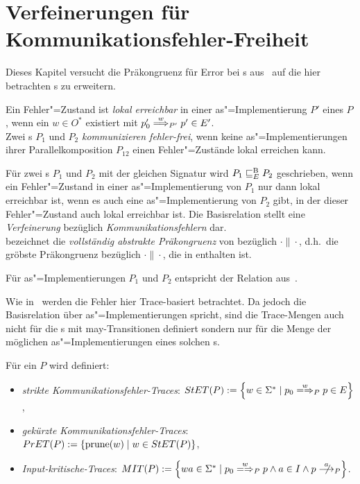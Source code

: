 \chapter{Verfeinerungen für Kommunikationsfehler-Freiheit}

Dieses Kapitel versucht die Präkongruenz für Error bei \EIO{}s
aus~\cite{Schinko2016BA} auf die hier betrachten \MEIO{}s zu erweitern.

\begin{Def}
  Ein Fehler"=Zustand ist \emph{lokal erreichbar} in einer
  as"=Implementierung $P'$ eines \MEIO{} $P$, wenn ein $w\in O^*$ existiert mit
  $p'_0 \weakmust[w]_{P'} p'\in E'$.\\
  Zwei \MEIO{}s $P_1$ und $P_2$ \emph{kommunizieren fehler-frei}, wenn keine
  as"=Implementierungen ihrer Parallelkomposition $P_{12}$ einen
  Fehler"=Zustände lokal erreichen kann.
\end{Def}

\begin{Def}
  \label{EBRelDef}
  Für zwei \MEIO{}s $P_1$ und $P_2$ mit der gleichen Signatur wird $P_1 \sqsubseteq  _E^\mathrm{B}{} P_2$
  geschrieben, wenn ein Fehler"=Zustand in einer as"=Implementierung
  von $P_1$ nur dann lokal erreichbar ist, wenn es auch eine as"=Implementierung
  von $P_2$ gibt, in der dieser Fehler"=Zustand auch lokal
  erreichbar ist. Die Basisrelation stellt eine \emph{Verfeinerung} bezüglich
  \emph{Kommunikationsfehlern} dar.\\
  \ECRel{} bezeichnet die \emph{vollständig abstrakte Präkongruenz} von
  \EBRel{} bezüglich $\cdot\|\cdot$, d.h.\ die gröbste Präkongruenz bezüglich
  $\cdot\|\cdot$, die in \EBRel{} enthalten ist.
\end{Def}

Für as"=Implementierungen $P_1$ und $P_2$ entspricht \EBRel{} der Relation
\EBbaRel{} aus~\cite{Schinko2016BA}.

Wie in~\cite{Schinko2016BA} werden die Fehler hier Trace-basiert betrachtet. Da
jedoch die Basisrelation über as"=Implementierungen spricht, sind die Trace-Mengen
auch nicht für die \MEIO{}s mit may-Transitionen definiert sondern nur für die
Menge der möglichen as"=Implementierungen eines solchen \MEIO{}s.

\begin{Def}
  Für ein \MEIO{} $P$ wird definiert:
  \begin{itemize}
    \item \emph{strikte Kommunikationsfehler-Traces}: $\StET (P) :=
      \left\{w\in\Sigma ^* \mid p_0 \weakmay[w]_P p \in E\right\}$,
    \item \emph{gekürzte Kommunikationsfehler-Traces}: $PrET (P) :=
      \left\{\mathrm{prune} (w) \mid w\in StET (P)\right\}$,
    \item \emph{Input-kritische-Traces}: $\MIT (P) := \left\{wa\in\Sigma ^*
      \mid p_0 \weakmay[w]_P p \land a\in I\land p\nmust[a]_P \right\}$.
  \end{itemize}
\end{Def}


